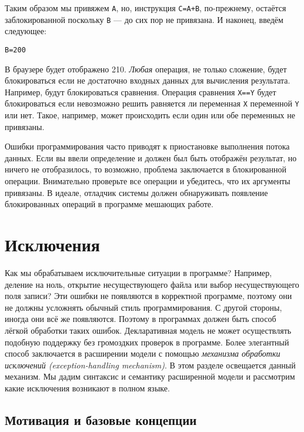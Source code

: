 Таким образом мы привяжем \lstinline|A|, но, инструкция \lstinline|C=A+B|, по-прежнему, остаётся заблокированной поскольку \lstinline|B| --- до сих пор не привязана. И наконец, введём следующее:

\begin{lstlisting}
B=200
\end{lstlisting}

В браузере будет отображено 210. \emph{Любая} операция, не только сложение, будет блокироваться если не достаточно входных данных для вычисления результата. Например, будут блокироваться сравнения. Операция сравнения \lstinline|X==Y| будет блокироваться если невозможно решить равняется ли переменная \lstinline|X| переменной \lstinline|Y| или нет. Такое, например, может происходить если один или обе переменных не привязаны.

Ошибки программирования часто приводят к приостановке выполнения потока данных. Если вы ввели определение и должен был быть отображён результат, но ничего не отобразилось, то возможно, проблема заключается в блокированной операции. Внимательно проверьте все операции и убедитесь, что их аргументы привязаны. В идеале, отладчик системы должен обнаруживать появление блокированных операций в программе мешающих работе.

\section{Исключения}\label{section:exceptions}

Как мы обрабатываем исключительные ситуации в программе? Например, деление на ноль, открытие несуществующего файла или выбор несуществующего поля записи? Эти ошибки не появляются в корректной программе, поэтому они не должны усложнять обычный стиль программирования. С другой стороны, иногда они всё же появляются. Поэтому в программах должен быть способ лёгкой обработки таких ошибок. Декларативная модель не может осуществлять подобную поддержку без громоздких проверок в программе. Более элегантный способ заключается в расширении модели с помощью \emph{механизма обработки исключений (exception-handling mechanism)}. В этом разделе освещается данный механизм. Мы дадим синтаксис и семантику расширенной модели и рассмотрим какие исключения возникают в полном языке.

\subsection{Мотивация и базовые концепции}

